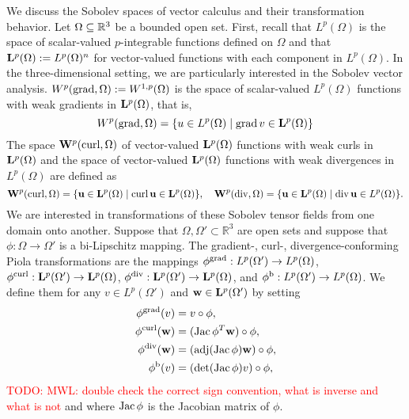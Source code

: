 \documentclass[12pt,a4paper]{article}
\newcommand{\todo}[1]{\textcolor{red}{TODO: #1}}
\begin{document}
We discuss the Sobolev spaces of vector calculus and their transformation behavior. 
Let $\Omega \subseteq {\mathbb R}^{3}$ be a bounded open set. 
First, recall that $L^{p}(\Omega)$ is the space of scalar-valued $p$-integrable functions defined on $\Omega$
and that ${\mathbf L}^{p}(\Omega) := L^{p}(\Omega)^{n}$ for vector-valued functions with each component in $L^{p}(\Omega)$. 
In the three-dimensional setting, we are particularly interested in the Sobolev vector analysis. 
$W^p(\operatorname{grad},\Omega) := W^{1,p}(\Omega)$ is the space of scalar-valued $L^{p}(\Omega)$ functions with weak gradients in ${\mathbf L}^{p}(\Omega)$, that is,  
\[
    W^p(\grad,\Omega) = \{ u \in L^{p}(\Omega) \suchthat \grad v \in \bfL^{p}(\Omega) \}
\]
The space ${\mathbf W}^{p}(\operatorname{curl},\Omega)$ of vector-valued ${\mathbf L}^{p}(\Omega)$ functions with weak curls in ${\mathbf L}^{p}(\Omega)$
and the space of vector-valued ${\mathbf L}^{p}(\Omega)$ functions with weak divergences in $L^{p}(\Omega)$ are defined as 
\[
    \bfW^{p}(\curl,\Omega) = \{ \bfu \in \bfL^{p}(\Omega) \suchthat \curl \bfu \in \bfL^{p}(\Omega) \},
    \quad 
    \bfW^{p}(\divergence,\Omega) = \{ \bfu \in \bfL^{p}(\Omega) \suchthat \divergence \bfu \in L^{p}(\Omega) \}.
\]
We are interested in transformations of these Sobolev tensor fields from one domain onto another. 
Suppose that $\Omega, \Omega' \subset \mathbb{R}^3$ are open sets and suppose that $\phi: \Omega \to \Omega'$ is a bi-Lipschitz mapping.
The gradient-, curl-, divergence-conforming Piola transformations are the mappings 
$\phi^{\operatorname{grad}}: L^{p}(\Omega') \to L^{p}(\Omega)$,
$\phi^{\operatorname{curl}}: {\mathbf L}^{p}(\Omega') \to {\mathbf L}^{p}(\Omega)$, 
$\phi^{\operatorname{div}}: {\mathbf L}^{p}(\Omega') \to {\mathbf L}^{p}(\Omega)$,
and
$\phi^{\rm b}: L^{p}(\Omega') \to L^{p}(\Omega)$. 
We define them 
for any $v \in L^{p}(\Omega')$ and ${\mathbf w} \in {\mathbf L}^{p}(\Omega')$ by setting 
\begin{subequations}\label{eq_definition_piola}
\begin{align}
    \phi^{\operatorname{grad}}(v) &= v \circ \phi, \\
    \phi^{\operatorname{curl}}({\mathbf w}) &= (\operatorname{{\rm Jac}}\phi^{T} {\mathbf w}) \circ \phi, \\
    \phi^{\operatorname{div}}({\mathbf w}) &= \left( \operatorname{adj}(\operatorname{{\rm Jac}}\phi) {\mathbf w} \right)  \circ \phi, \\
    \phi^{\rm b}(v) &= \left( \det(\operatorname{{\rm Jac}}\phi) v \right)  \circ \phi,
\end{align}
\end{subequations}
\todo{MWL: double check the correct sign convention, what is inverse and what is not}
and where $\operatorname{{\rm Jac}}\phi$ is the Jacobian matrix of $\phi$. 
\end{document}
